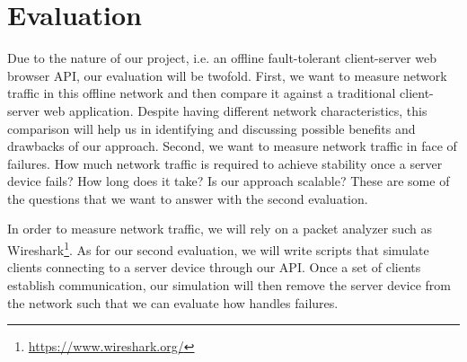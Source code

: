 \section{Evaluation}
\label{sec:evaluation}

Due to the nature of our project, i.e. an offline fault-tolerant client-server web browser API, our evaluation will be twofold. First, we want to measure network traffic in this offline network and then compare it against a traditional client-server web application. Despite having different network characteristics, this comparison will help us in identifying and discussing possible benefits and drawbacks of our approach. Second, we want to measure network traffic in face of failures. How much network traffic is required to achieve stability once a server device fails? How long does it take? Is our approach scalable? These are some of the questions that we want to answer with the second evaluation.

In order to measure network traffic, we will rely on a packet analyzer such as Wireshark\footnote{\url{https://www.wireshark.org/}}. As for our second evaluation, we will write scripts that simulate clients connecting to a server device through our \APIname{} API. Once a set of clients establish communication, our simulation will then remove the server device from the network such that we can evaluate how \APIname{} handles failures. 